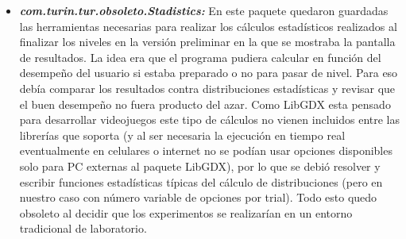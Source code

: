 \documentclass{article}
\numberwithin{figure}{section}
\begin{document}
\begin{itemize}
        \item \textit{\textbf{com.turin.tur.obsoleto.Stadistics:}} En este paquete quedaron guardadas las herramientas necesarias para realizar los cálculos estadísticos realizados al finalizar los niveles en la versión preliminar en la que se mostraba la pantalla de resultados. La idea era que el programa pudiera calcular en función del desempeño del usuario si estaba preparado o no para pasar de nivel. Para eso debía comparar los resultados contra distribuciones estadísticas y revisar que el buen desempeño no fuera producto del azar. Como LibGDX esta pensado para desarrollar videojuegos este tipo de cálculos no vienen incluidos entre las librerías que soporta (y al ser necesaria la ejecución en tiempo real eventualmente en celulares o internet no  se podían usar opciones disponibles solo para PC externas al paquete LibGDX), por lo que se debió resolver y escribir funciones estadísticas típicas del cálculo de distribuciones (pero en nuestro caso con número variable de opciones por trial). Todo esto quedo obsoleto al decidir que los experimentos se realizarían en un entorno tradicional de laboratorio. 
        

\end{itemize}
\end{document}
